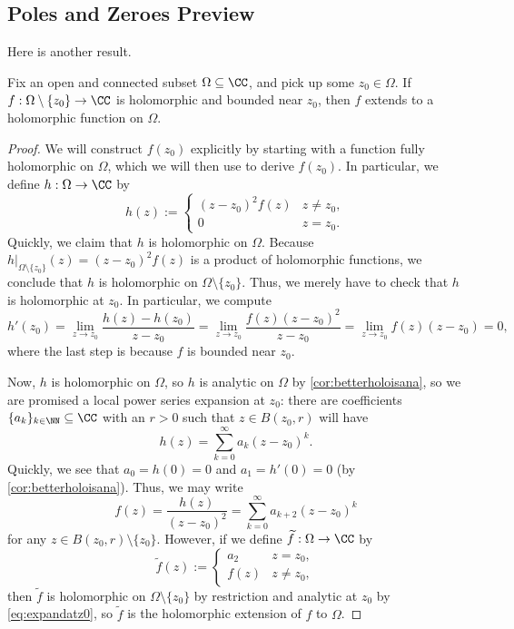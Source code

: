 \subsection{Poles and Zeroes Preview}
Here is another result.
\begin{theorem} \label{thm:riemannremove}
	Fix an open and connected subset $\Omega\subseteq\CC$, and pick up some $z_0\in\Omega$. If $f:\Omega\setminus\{z_0\}\to\CC$ is holomorphic and bounded near $z_0$, then $f$ extends to a holomorphic function on $\Omega$.
\end{theorem}
\begin{proof}
	We will construct $f(z_0)$ explicitly by starting with a function fully holomorphic on $\Omega$, which we will then use to derive $f(z_0)$. In particular, we define $h:\Omega\to\CC$ by
	\[h(z):=\begin{cases}
		(z-z_0)^2f(z) & z\ne z_0, \\
		0 & z=z_0.
	\end{cases}\]
	Quickly, we claim that $h$ is holomorphic on $\Omega$. Because $h|_{\Omega\setminus\{z_0\}}(z)=(z-z_0)^2f(z)$ is a product of holomorphic functions, we conclude that $h$ is holomorphic on $\Omega\setminus\{z_0\}$. Thus, we merely have to check that $h$ is holomorphic at $z_0$. In particular, we compute
	\[h'(z_0)=\lim_{z\to z_0}\frac{h(z)-h(z_0)}{z-z_0}=\lim_{z\to z_0}\frac{f(z)(z-z_0)^2}{z-z_0}=\lim_{z\to z_0}f(z)(z-z_0)=0,\]
	where the last step is because $f$ is bounded near $z_0$.

	Now, $h$ is holomorphic on $\Omega$, so $h$ is analytic on $\Omega$ by \autoref{cor:betterholoisana}, so we are promised a local power series expansion at $z_0$: there are coefficients $\{a_k\}_{k\in\NN}\subseteq\CC$ with an $r>0$ such that $z\in B(z_0,r)$ will have
	\[h(z)=\sum_{k=0}^\infty a_k(z-z_0)^k.\]
	Quickly, we see that $a_0=h(0)=0$ and $a_1=h'(0)=0$ (by \autoref{cor:betterholoisana}). Thus, we may write
	\[f(z)=\frac{h(z)}{(z-z_0)^2}=\sum_{k=0}^\infty a_{k+2}(z-z_0)^k\tag{$*$}\label{eq:expandatz0}\]
	for any $z\in B(z_0,r)\setminus\{z_0\}$. However, if we define $\widetilde f:\Omega\to\CC$ by
	\[\widetilde f(z):=\begin{cases}
		a_2 & z=z_0, \\
		f(z) & z\ne z_0,
	\end{cases}\]
	then $\widetilde f$ is holomorphic on $\Omega\setminus\{z_0\}$ by restriction and analytic at $z_0$ by \autoref{eq:expandatz0}, so $\widetilde f$ is the holomorphic extension of $f$ to $\Omega$.
\end{proof}
